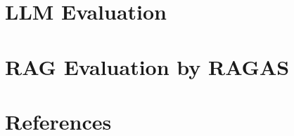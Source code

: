 \section[Intro]{LLM Evaluation}


\section[RAG]{RAG Evaluation by RAGAS}


\section[Refs]{References}
